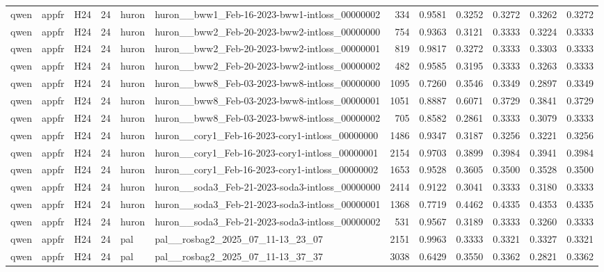 \begin{table}[tbp]
\begin{tabular}{lllrllrrrrrr}
qwen & appfr & H24 & 24 & huron & huron\_\_bww1\_Feb-16-2023-bww1-intloss\_00000002 & 334 & 0.9581 & 0.3252 & 0.3272 & 0.3262 & 0.3272 \\
qwen & appfr & H24 & 24 & huron & huron\_\_bww2\_Feb-20-2023-bww2-intloss\_00000000 & 754 & 0.9363 & 0.3121 & 0.3333 & 0.3224 & 0.3333 \\
qwen & appfr & H24 & 24 & huron & huron\_\_bww2\_Feb-20-2023-bww2-intloss\_00000001 & 819 & 0.9817 & 0.3272 & 0.3333 & 0.3303 & 0.3333 \\
qwen & appfr & H24 & 24 & huron & huron\_\_bww2\_Feb-20-2023-bww2-intloss\_00000002 & 482 & 0.9585 & 0.3195 & 0.3333 & 0.3263 & 0.3333 \\
qwen & appfr & H24 & 24 & huron & huron\_\_bww8\_Feb-03-2023-bww8-intloss\_00000000 & 1095 & 0.7260 & 0.3546 & 0.3349 & 0.2897 & 0.3349 \\
qwen & appfr & H24 & 24 & huron & huron\_\_bww8\_Feb-03-2023-bww8-intloss\_00000001 & 1051 & 0.8887 & 0.6071 & 0.3729 & 0.3841 & 0.3729 \\
qwen & appfr & H24 & 24 & huron & huron\_\_bww8\_Feb-03-2023-bww8-intloss\_00000002 & 705 & 0.8582 & 0.2861 & 0.3333 & 0.3079 & 0.3333 \\
qwen & appfr & H24 & 24 & huron & huron\_\_cory1\_Feb-16-2023-cory1-intloss\_00000000 & 1486 & 0.9347 & 0.3187 & 0.3256 & 0.3221 & 0.3256 \\
qwen & appfr & H24 & 24 & huron & huron\_\_cory1\_Feb-16-2023-cory1-intloss\_00000001 & 2154 & 0.9703 & 0.3899 & 0.3984 & 0.3941 & 0.3984 \\
qwen & appfr & H24 & 24 & huron & huron\_\_cory1\_Feb-16-2023-cory1-intloss\_00000002 & 1653 & 0.9528 & 0.3605 & 0.3500 & 0.3528 & 0.3500 \\
qwen & appfr & H24 & 24 & huron & huron\_\_soda3\_Feb-21-2023-soda3-intloss\_00000000 & 2414 & 0.9122 & 0.3041 & 0.3333 & 0.3180 & 0.3333 \\
qwen & appfr & H24 & 24 & huron & huron\_\_soda3\_Feb-21-2023-soda3-intloss\_00000001 & 1368 & 0.7719 & 0.4462 & 0.4335 & 0.4353 & 0.4335 \\
qwen & appfr & H24 & 24 & huron & huron\_\_soda3\_Feb-21-2023-soda3-intloss\_00000002 & 531 & 0.9567 & 0.3189 & 0.3333 & 0.3260 & 0.3333 \\
qwen & appfr & H24 & 24 & pal & pal\_\_rosbag2\_2025\_07\_11-13\_23\_07 & 2151 & 0.9963 & 0.3333 & 0.3321 & 0.3327 & 0.3321 \\
qwen & appfr & H24 & 24 & pal & pal\_\_rosbag2\_2025\_07\_11-13\_37\_37 & 3038 & 0.6429 & 0.3550 & 0.3362 & 0.2821 & 0.3362 \\

\end{tabular}
\end{table}

